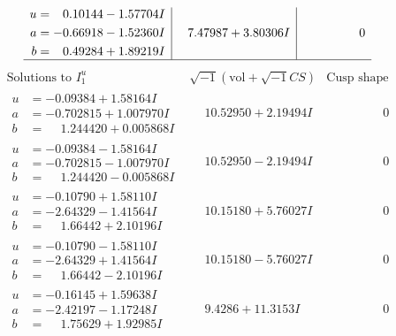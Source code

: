 \documentclass[1p]{elsarticle_modified}
\theoremstyle{definition}
\newcommand{\I}{\sqrt{-1}}
\begin{document}
$$\begin{array}{c|c|c}
\begin{aligned}
u &= \phantom{-}0.10144 - 1.57704 I \\
a &= -0.66918 - 1.52360 I \\
b &= \phantom{-}0.49284 + 1.89219 I\end{aligned}
 & \phantom{-}7.47987 + 3.80306 I & \phantom{-0.000000 } 0\\
 \hline 
 \end{array}$$\newpage$$\begin{array}{c|c|c}  
\text{Solutions to }I^u_{1}& \I (\text{vol} + \sqrt{-1}CS) & \text{Cusp shape}\\
 \hline 
\begin{aligned}
u &= -0.09384 + 1.58164 I \\
a &= -0.702815 + 1.007970 I \\
b &= \phantom{-}1.244420 + 0.005868 I\end{aligned}
 & \phantom{-}10.52950 + 2.19494 I & \phantom{-0.000000 } 0 \\ \hline\begin{aligned}
u &= -0.09384 - 1.58164 I \\
a &= -0.702815 - 1.007970 I \\
b &= \phantom{-}1.244420 - 0.005868 I\end{aligned}
 & \phantom{-}10.52950 - 2.19494 I & \phantom{-0.000000 } 0 \\ \hline\begin{aligned}
u &= -0.10790 + 1.58110 I \\
a &= -2.64329 - 1.41564 I \\
b &= \phantom{-}1.66442 + 2.10196 I\end{aligned}
 & \phantom{-}10.15180 + 5.76027 I & \phantom{-0.000000 } 0 \\ \hline\begin{aligned}
u &= -0.10790 - 1.58110 I \\
a &= -2.64329 + 1.41564 I \\
b &= \phantom{-}1.66442 - 2.10196 I\end{aligned}
 & \phantom{-}10.15180 - 5.76027 I & \phantom{-0.000000 } 0 \\ \hline\begin{aligned}
u &= -0.16145 + 1.59638 I \\
a &= -2.42197 - 1.17248 I \\
b &= \phantom{-}1.75629 + 1.92985 I\end{aligned}
 & \phantom{-}9.4286 + 11.3153 I & \phantom{-0.000000 } 0 \\ \hline\begin{aligned}

\end{aligned}
\end{array}$$
\end{document}
